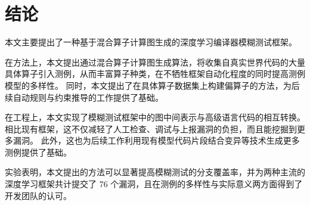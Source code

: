 
\chapter{结论}
\label{chp:sum}

本文主要提出了一种基于混合算子计算图生成的深度学习编译器模糊测试框架。

在方法上，本文提出通过混合算子计算图生成算法，将收集自真实世界代码的大量具体算子引入测例，从而丰富算子种类，在不牺牲框架自动化程度的同时提高测例模型的多样性。
同时，本文提出了在具体算子数据集上构建偏算子的方法，为后续自动规则与约束推导的工作提供了基础。

在工程上，本文实现了模糊测试框架中的图中间表示与高级语言代码的相互转换。
相比现有框架，这不仅减轻了人工检查、调试与上报漏洞的负担，而且能挖掘到更多漏洞。
此外，这也为后续工作利用现有模型代码片段结合变异等技术生成更多测例提供了基础。

实验表明，本文提出的方法可以显著提高模糊测试的分支覆盖率，并为两种主流的深度学习框架共计提交了 76 个漏洞，且在测例的多样性与实际意义两方面得到了开发团队的认可。
